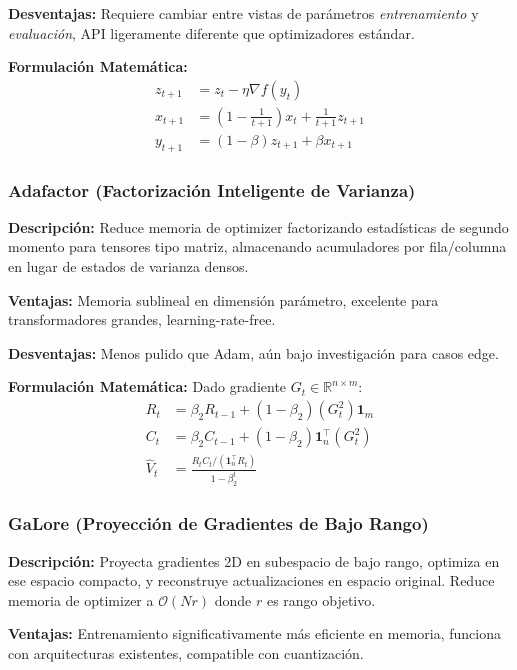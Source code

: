 \documentclass[11pt,a4paper]{article}
\begin{document}
\textbf{Desventajas:} Requiere cambiar entre vistas de parámetros \textit{entrenamiento} y \textit{evaluación}, API ligeramente diferente que optimizadores estándar.

\textbf{Formulación Matemática:}
\begin{align}
z_{t+1} &= z_t - \eta \nabla f(y_t) \\
x_{t+1} &= \left(1 - \frac{1}{t+1}\right) x_t + \frac{1}{t+1} z_{t+1} \\
y_{t+1} &= (1 - \beta) z_{t+1} + \beta x_{t+1}
\end{align}

\subsubsection{Adafactor (Factorización Inteligente de Varianza)}

\textbf{Descripción:} Reduce memoria de optimizer factorizando estadísticas de segundo momento para tensores tipo matriz, almacenando acumuladores por fila/columna en lugar de estados de varianza densos.

\textbf{Ventajas:} Memoria sublineal en dimensión parámetro, excelente para transformadores grandes, learning-rate-free.

\textbf{Desventajas:} Menos pulido que Adam, aún bajo investigación para casos edge.

\textbf{Formulación Matemática:} Dado gradiente $G_t \in \mathbb{R}^{n \times m}$:
\begin{align}
R_t &= \beta_2 R_{t-1} + (1 - \beta_2)(G_t^2) \mathbf{1}_m \\
C_t &= \beta_2 C_{t-1} + (1 - \beta_2) \mathbf{1}_n^\top (G_t^2) \\
\hat{V}_t &= \frac{R_t C_t / (\mathbf{1}_n^\top R_t)}{1 - \beta_2^t}
\end{align}

\subsubsection{GaLore (Proyección de Gradientes de Bajo Rango)}

\textbf{Descripción:} Proyecta gradientes 2D en subespacio de bajo rango, optimiza en ese espacio compacto, y reconstruye actualizaciones en espacio original. Reduce memoria de optimizer a $\mathcal{O}(Nr)$ donde $r$ es rango objetivo.

\textbf{Ventajas:} Entrenamiento significativamente más eficiente en memoria, funciona con arquitecturas existentes, compatible con cuantización.
\end{document}
